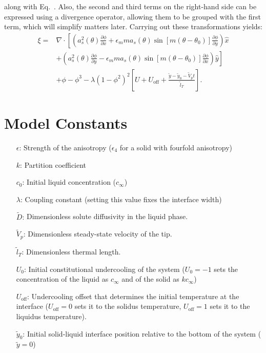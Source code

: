 \documentclass[10pt]{article}
\begin{document}
along with Eq.~. Also, the second and third terms on the right-hand side can be expressed using a divergence operator, allowing them to be grouped with the first term, which will simplify matters later. Carrying out these transformations yields:
\begin{equation}
\label{eqxi2}
\begin{split}
\xi = & \nabla \cdot  \left[ \left(a_s^2(\theta) \frac{\partial \phi}{\partial x} + \epsilon_m m a_s(\theta) \sin \left[ m \left(\theta - \theta_0 \right) \right] \frac{\partial \phi}{\partial y}\right)\hat{x} \right. \\ 
& \left . + \left(a_s^2(\theta) \frac{\partial \phi}{\partial y} - \epsilon_m m a_s(\theta) \sin \left[ m \left(\theta - \theta_0 \right) \right] \frac{\partial \phi}{\partial x}\right)\hat{y}\right] \\
&+ \phi-\phi^3 - \lambda{(1-\phi^2)}^2 \left[ U + U_\text{off} + \frac{\tilde{y} - \tilde{y}_0 - \tilde{V}_p t}{\tilde{l}_T} \right].
\end{split}
\end{equation}

\section{Model Constants}

\begin{itemize}
\item[$\epsilon$:] Strength of the anisotropy ($\epsilon_4$ for a solid with fourfold anisotropy)%
\item[$k$:] Partition coefficient%
\item[$c_0$:] Initial liquid concentration ($c_\infty$)%
\item[$\lambda$:] Coupling constant (setting this value fixes the interface width)%
\item[$\tilde{D}$:] Dimensionless solute diffusivity in the liquid phase.%
\item[$\tilde{V}_p$:] Dimensionless steady-state velocity of the tip.%
\item[$\tilde{l}_T$:] Dimensionless thermal length.%
\item[$U_0$:] Initial constitutional undercooling of the system ($U_0=-1$ sets the concentration of the liquid as $c_\infty$ and of the solid as $kc_\infty$)%
\item[$U_{\text{off}}$:] Undercooling offset that determines the initial temperature at the interface ($U_{\text{off}}=0$ sets it to the solidus temperature,  $U_{\text{off}}=1$ sets it to the liquidus temperature).%
\item[$\tilde{y}_0$:] Initial solid-liquid interface position relative to the bottom of the system ($\tilde{y}=0$)%
\end{itemize}
\end{document}
